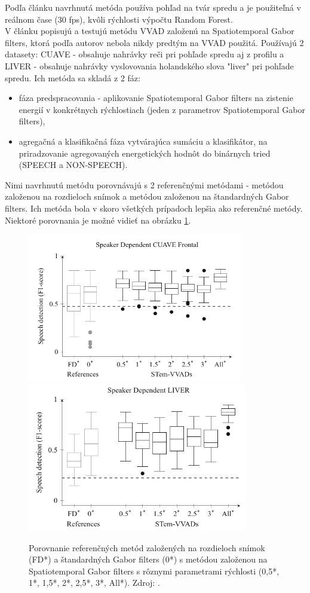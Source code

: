 Podľa článku navrhnutá metóda používa pohľad na tvár spredu a je použiteľná v reálnom čase (30 fps), kvôli rýchlosti výpočtu Random Forest.\\

V článku \cite{joosten2015voice} popisujú a testujú metódu VVAD založenú na Spatiotemporal Gabor filters, ktorá podľa autorov nebola nikdy predtým na VVAD použitá.
Používajú 2 datasety: CUAVE - obsahuje nahrávky reči pri pohľade spredu aj z profilu a LIVER - obsahuje nahrávky vyslovovania holandského slova "liver" pri pohľade spredu.
Ich metóda sa skladá z 2 fáz: 
\begin{itemize}
	\item fáza predspracovania - aplikovanie Spatiotemporal Gabor filters na zistenie energií v konkrétnych rýchlostiach (jeden z parametrov Spatiotemporal Gabor filters),
	\item agregačná a klasifikačná fáza vytvárajúca sumáciu a klasifikátor, na priradzovanie agregovaných energetických hodnôt do binárnych tried (SPEECH a NON-SPEECH).
\end{itemize}
Nimi navrhnutú metódu porovnávajú s 2 referenčnými metódami - metódou založenou na rozdieloch snímok a metódou založenou na štandardných Gabor filters. 
Ich metóda bola v skoro všetkých prípadoch lepšia ako referenčné metódy. 
Niektoré porovnania je možné vidieť na obrázku \ref{pic-joosten2015voice}.

\begin{figure}[H]
	\begin{center}
		\includegraphics[height=6.5cm]{pics/cuaveFrontal.png}
		\includegraphics[height=6.5cm]{pics/liver.png}
		\caption{Porovnanie referenčných metód založených na rozdieloch snímok (FD*) a štandardných Gabor filters (0*) s metódou založenou na Spatiotemporal Gabor filters s rôznymi parametrami rýchlosti (0,5*, 1*, 1,5*, 2*, 2,5*, 3*, All*).
		Zdroj: \cite{joosten2015voice}.}
		\label{pic-joosten2015voice}
	\end{center}
\end{figure}

